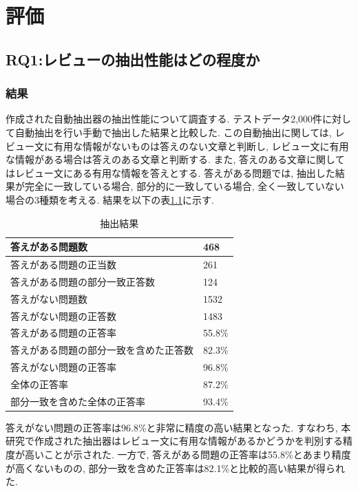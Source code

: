 \chapter{評価}
\label{chap:kekkahyouka}

\section{RQ1:レビューの抽出性能はどの程度か}
\subsection{結果}
作成された自動抽出器の抽出性能について調査する. テストデータ2,000件に対して自動抽出を行い手動で抽出した結果と比較した. この自動抽出に関しては, レビュー文に有用な情報がないものは答えのない文章と判断し, レビュー文に有用な情報がある場合は答えのある文章と判断する. また, 答えのある文章に関してはレビュー文にある有用な情報を答えとする. 
答えがある問題では, 抽出した結果が完全に一致している場合, 部分的に一致している場合, 全く一致していない場合の3種類を考える. 結果を以下の表\ref{tb:qa}に示す. 

\begin{table}[H]
  \caption{抽出結果}
  \small
  \label{tb:qa}
  \begin{center}
  \begin{tabularx}{\linewidth}{X|X}
    \hline
    答えがある問題数&468\\\hline
    答えがある問題の正当数&261\\\hline
    答えがある問題の部分一致正答数&124\\\hline
    答えがない問題数&1532\\\hline
    答えがない問題の正答数&1483\\\hline\hline
    答えがある問題の正答率&55.8\%\\\hline
    答えがある問題の部分一致を含めた正答数&82.3\%\\\hline
    答えがない問題の正答率&96.8\%\\\hline\hline
    全体の正答率&87.2\%\\\hline
    部分一致を含めた全体の正答率&93.4\%\\\hline
  \end{tabularx}\end{center}
\end{table}

答えがない問題の正答率は96.8\%と非常に精度の高い結果となった. すなわち, 本研究で作成された抽出器はレビュー文に有用な情報があるかどうかを判別する精度が高いことが示された. 
一方で, 答えがある問題の正答率は55.8\%とあまり精度が高くないものの, 部分一致を含めた正答率は82.1\%と比較的高い結果が得られた. 

